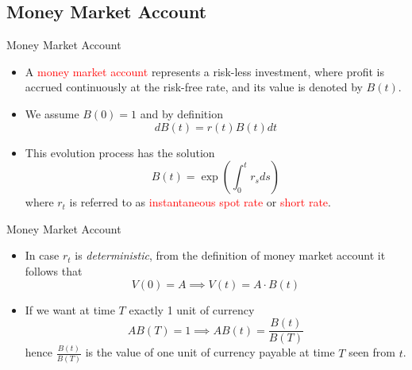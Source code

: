\documentclass{beamer}
\begin{document}
\subsection{Money Market Account}
\begin{frame}{Money Market Account}
	\begin{itemize}
		\item A \textcolor{red}{money market account} represents a risk-less investment, where profit is accrued continuously at the risk-free rate, and its value is denoted by $B(t)$.
		\item We assume $B(0)=1$ and by definition
		\begin{equation}
			dB(t) = r(t)B(t)dt
		\end{equation}
		\item This evolution process has the solution 
		\begin{equation}
			B(t) = \exp\left(\int_0^t r_s ds\right)
		\end{equation}
		where $r_t$ is referred to as \textcolor{red}{instantaneous spot rate} or  \textcolor{red}{short rate}.
	\end{itemize}
\end{frame}

\begin{frame}{Money Market Account}
	\begin{itemize}
		\item In case $r_t$ is \emph{deterministic}, from the definition of money market account it follows that 
		\begin{equation*}
			V(0) = A \implies V(t) = A\cdot B(t)
		\end{equation*}
		\item If we want at time $T$ exactly 1 unit of currency
		\begin{equation*}
			AB(T) = 1 \implies AB(t) = \frac{B(t)}{B(T)} 
		\end{equation*}
		hence $\frac{B(t)}{B(T)}$ is the value of one unit of currency payable at time $T$ seen from $t$.
		
	\end{itemize}
\end{frame}
\end{document}
